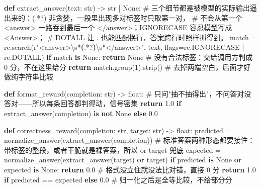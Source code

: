 \documentclass[
  chinese,
]{ctexart}
\newenvironment{Shaded}{\begin{snugshade}}{\end{snugshade}}
\newcommand{\BuiltInTok}[1]{\textcolor[rgb]{0.00,0.23,0.31}{#1}}
\newcommand{\CommentTok}[1]{\textcolor[rgb]{0.37,0.37,0.37}{#1}}
\newcommand{\ControlFlowTok}[1]{\textcolor[rgb]{0.00,0.23,0.31}{\textbf{#1}}}
\newcommand{\DecValTok}[1]{\textcolor[rgb]{0.68,0.00,0.00}{#1}}
\newcommand{\FloatTok}[1]{\textcolor[rgb]{0.68,0.00,0.00}{#1}}
\newcommand{\KeywordTok}[1]{\textcolor[rgb]{0.00,0.23,0.31}{\textbf{#1}}}
\newcommand{\NormalTok}[1]{\textcolor[rgb]{0.00,0.23,0.31}{#1}}
\newcommand{\OperatorTok}[1]{\textcolor[rgb]{0.37,0.37,0.37}{#1}}
\newcommand{\VariableTok}[1]{\textcolor[rgb]{0.07,0.07,0.07}{#1}}
\newcommand{\VerbatimStringTok}[1]{\textcolor[rgb]{0.13,0.47,0.30}{#1}}
\begin{document}
\begin{Shaded}
\begin{Highlighting}[]
\KeywordTok{def}\NormalTok{ extract\_answer(text: }\BuiltInTok{str}\NormalTok{) }\OperatorTok{{-}\textgreater{}} \BuiltInTok{str} \OperatorTok{|} \VariableTok{None}\NormalTok{:}
    \CommentTok{\# 三个细节都是被模型的实际输出逼出来的：\textasciigrave{}(.*?)\textasciigrave{} 非贪婪，一段里出现多对标签时只取第一对，}
    \CommentTok{\# 不会从第一个 \textless{}answer\textgreater{} 一路吞到最后一个 \textless{}/answer\textgreater{}；IGNORECASE 容忍模型写成 \textless{}Answer\textgreater{}；}
    \CommentTok{\# DOTALL 让 \textasciigrave{}.\textasciigrave{} 也能匹配换行，答案跨行时照样抓得到。}
\NormalTok{    match }\OperatorTok{=}\NormalTok{ re.search(}\VerbatimStringTok{r"\textless{}answer\textgreater{}}\DecValTok{\textbackslash{}s}\OperatorTok{*}\KeywordTok{(}\DecValTok{.}\OperatorTok{*?}\KeywordTok{)}\DecValTok{\textbackslash{}s}\OperatorTok{*}\VerbatimStringTok{\textless{}/answer\textgreater{}"}\NormalTok{, text, flags}\OperatorTok{=}\NormalTok{re.IGNORECASE }\OperatorTok{|}\NormalTok{ re.DOTALL)}
    \ControlFlowTok{if}\NormalTok{ match }\KeywordTok{is} \VariableTok{None}\NormalTok{:}
        \ControlFlowTok{return} \VariableTok{None}                      \CommentTok{\# 没有合法标签：交给调用方判成 0 分，不在这里给分}
    \ControlFlowTok{return}\NormalTok{ match.group(}\DecValTok{1}\NormalTok{).strip()        }\CommentTok{\# 去掉两端空白，后面才好做纯字符串比较}


\KeywordTok{def}\NormalTok{ format\_reward(completion: }\BuiltInTok{str}\NormalTok{) }\OperatorTok{{-}\textgreater{}} \BuiltInTok{float}\NormalTok{:}
    \CommentTok{\# 只问"抽不抽得出"，不问答对没答对——所以每条回答都判得动，信号密集}
    \ControlFlowTok{return} \FloatTok{1.0} \ControlFlowTok{if}\NormalTok{ extract\_answer(completion) }\KeywordTok{is} \KeywordTok{not} \VariableTok{None} \ControlFlowTok{else} \FloatTok{0.0}


\KeywordTok{def}\NormalTok{ correctness\_reward(completion: }\BuiltInTok{str}\NormalTok{, target: }\BuiltInTok{str}\NormalTok{) }\OperatorTok{{-}\textgreater{}} \BuiltInTok{float}\NormalTok{:}
\NormalTok{    predicted }\OperatorTok{=}\NormalTok{ normalize\_answer(extract\_answer(completion))}
    \CommentTok{\# 标准答案两种形态都要接住：带标签的整段，或者干脆就是裸答案，所以 \textasciigrave{}or target\textasciigrave{} 兜底}
\NormalTok{    expected }\OperatorTok{=}\NormalTok{ normalize\_answer(extract\_answer(target) }\KeywordTok{or}\NormalTok{ target)}
    \ControlFlowTok{if}\NormalTok{ predicted }\KeywordTok{is} \VariableTok{None} \KeywordTok{or}\NormalTok{ expected }\KeywordTok{is} \VariableTok{None}\NormalTok{:}
        \ControlFlowTok{return} \FloatTok{0.0}                       \CommentTok{\# 格式没立住就没法比对错，直接 0 分}
    \ControlFlowTok{return} \FloatTok{1.0} \ControlFlowTok{if}\NormalTok{ predicted }\OperatorTok{==}\NormalTok{ expected }\ControlFlowTok{else} \FloatTok{0.0}     \CommentTok{\# 归一化之后是全等比较，不给部分分}
\end{Highlighting}
\end{Shaded}
\end{document}
